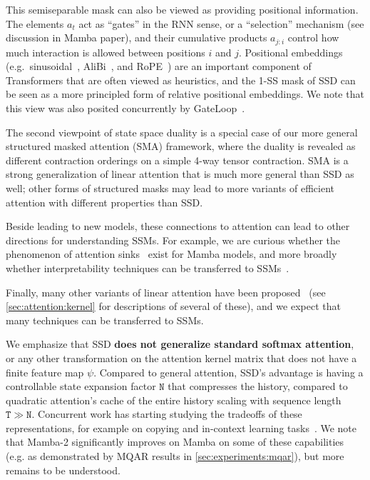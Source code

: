 This semiseparable mask can also be viewed as providing positional information.
The elements $a_t$ act as ``gates'' in the RNN sense, or a ``selection'' mechanism (see discussion in Mamba paper),
and their cumulative products $a_{j:i}$ control how much interaction is allowed between positions $i$ and $j$.
Positional embeddings (e.g.\ sinusoidal~\citep{vaswani2017attention}, AliBi~\citep{press2022train}, and RoPE~\citep{su2021roformer}) are an important component of Transformers that are often viewed as heuristics,
and the 1-SS mask of SSD can be seen as a more principled form of relative positional embeddings.
We note that this view was also posited concurrently by GateLoop~\citep{katsch2023gateloop}.



The second viewpoint of state space duality is a special case of our more general structured masked attention (SMA) framework,
where the duality is revealed as different contraction orderings on a simple 4-way tensor contraction.
SMA is a strong generalization of linear attention that is much more general than SSD as well;
other forms of structured masks may lead to more variants of efficient attention with different properties than SSD.

Beside leading to new models, these connections to attention can lead to other directions for understanding SSMs.
For example, we are curious whether the phenomenon of attention sinks~\citep{darcet2024vision,xiao2024efficient} exist for Mamba models,
and more broadly whether interpretability techniques can be transferred to SSMs~\citep{ali2024hidden}.


Finally, many other variants of linear attention have been proposed~\citep{schlag2021linear,peng2021random,choromanski2021rethinking,qin2022devil,qin2022cosformer,zheng2022linear,zhang2024hedgehog,arora2024zoology,arora2024simple} (see \cref{sec:attention:kernel} for descriptions of several of these),
and we expect that many techniques can be transferred to SSMs\iftoggle{arxiv}{ (e.g. \cref{sec:architecture:kernels})}{}.




We emphasize that SSD \textbf{does not generalize standard softmax attention}, or any other transformation on the attention kernel matrix that does not have a finite feature map $\psi$.
Compared to general attention, SSD's advantage is having a controllable state expansion factor $\mathtt{N}$ that compresses the history, compared to quadratic attention's cache of the entire history scaling with sequence length $\mathtt{T} \gg \mathtt{N}$.
Concurrent work has starting studying the tradeoffs of these representations, for example on copying and in-context learning tasks~\citep{akyurek2024context,jelassi2024repeat,grazzi2024mamba,park2024can}.
We note that Mamba-2 significantly improves on Mamba on some of these capabilities (e.g. as demonstrated by MQAR results in \cref{sec:experiments:mqar}), but more remains to be understood.


